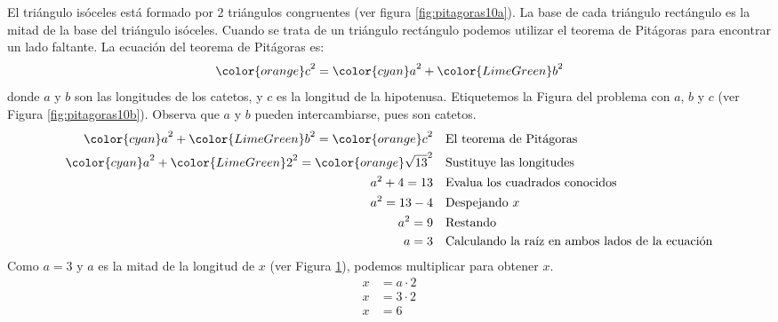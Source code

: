 \begin{solutionbox}{10cm}
\begin{minipage}{0.2\textwidth}
\begin{figure}[H]
            \caption{}
            \label{fig:pitagoras10c}
        \end{figure}
    \end{minipage}\hfill
    \begin{minipage}{0.7\textwidth}
        El triángulo isóceles está formado por 2 triángulos congruentes (ver figura \ref{fig:pitagoras10a}).
        La base de cada triángulo rectángulo es la mitad de la base del triángulo isóceles.
        Cuando se trata de un triángulo rectángulo podemos utilizar el teorema de Pitágoras para encontrar un lado faltante.
        La ecuación del teorema de Pitágoras es:
        \[{\color{orange}c}^2={\color{cyan}a}^2+{\color{LimeGreen}b}^2\]
        donde $a$ y $b$ son las longitudes de los catetos, y $c$ es la longitud de la hipotenusa.
        Etiquetemos la Figura del problema con $a$, $b$ y $c$ (ver Figura \ref{fig:pitagoras10b}).
        Observa que $a$ y $b$ pueden intercambiarse, pues son catetos.
        \begin{align*}
            {\color{cyan}a}^2+{\color{LimeGreen}b}^2  ={\color{orange}c}^2         & \text{\quad El teorema de Pitágoras}                          \\
            {\color{cyan}a}^2+{\color{LimeGreen}2}^2  ={\color{orange}\sqrt{13}}^2 & \text{\quad Sustituye las longitudes}                         \\
            a^2+4   =13                                                            & \text{\quad Evalua los cuadrados conocidos}                   \\
            a^2=13-4                                                               & \text{\quad Despejando } x                                    \\
            a^2=9                                                                  & \text{\quad Restando}                                         \\
            a=3                                                                    & \text{\quad Calculando la raíz en ambos lados de la ecuación} \\
        \end{align*}
        Como $a=3$ y $a$ es la mitad de la longitud de $x$ (ver Figura \ref{fig:pitagoras10c}), podemos multiplicar para obtener $x$.
        \begin{align*}
            x & = a\cdot 2 \\
            x & = 3\cdot 2 \\
            x & = 6        \\
        \end{align*}
    \end{minipage}
\end{solutionbox}
